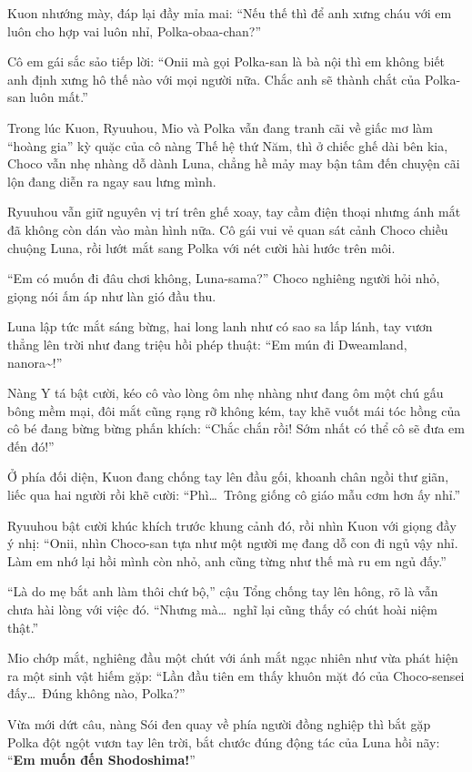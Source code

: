 \documentclass[../main.tex]{subfiles}
\begin{document}
Kuon nhướng mày, đáp lại đầy mỉa mai: ``Nếu thế thì để anh xưng cháu với em luôn cho hợp vai luôn nhỉ, Polka-obaa-chan?''

Cô em gái sắc sảo tiếp lời: ``Onii mà gọi Polka-san là bà nội thì em không biết anh định xưng hô thế nào với mọi người nữa. Chắc anh sẽ thành chắt của Polka-san luôn mất.''

Trong lúc Kuon, Ryuuhou, Mio và Polka vẫn đang tranh cãi về giấc mơ làm ``hoàng gia'' kỳ quặc của cô nàng Thế hệ thứ Năm, thì ở chiếc ghế dài bên kia, Choco vẫn nhẹ nhàng dỗ dành Luna, chẳng hề mảy may bận tâm đến chuyện cãi lộn đang diễn ra ngay sau lưng mình.

Ryuuhou vẫn giữ nguyên vị trí trên ghế xoay, tay cầm điện thoại nhưng ánh mắt đã không còn dán vào màn hình nữa. Cô gái vui vẻ quan sát cảnh Choco chiều chuộng Luna, rồi lướt mắt sang Polka với nét cười hài hước trên môi.

``Em có muốn đi đâu chơi không, Luna-sama?'' Choco nghiêng người hỏi nhỏ, giọng nói ấm áp như làn gió đầu thu.

Luna lập tức mắt sáng bừng, hai long lanh như có sao sa lấp lánh, tay vươn thẳng lên trời như đang triệu hồi phép thuật: ``Em mún đi Dweamland, nanora\~{}!''

Nàng Y tá bật cười, kéo cô vào lòng ôm nhẹ nhàng như đang ôm một chú gấu bông mềm mại, đôi mắt cũng rạng rỡ không kém, tay khẽ vuốt mái tóc hồng của cô bé đang bừng bừng phấn khích: ``Chắc chắn rồi! Sớm nhất có thể cô sẽ đưa em đến đó!''


Ở phía đối diện, Kuon đang chống tay lên đầu gối, khoanh chân ngồi thư giãn, liếc qua hai người rồi khẽ cười: ``Phì\dots\ Trông giống cô giáo mẫu cơm hơn ấy nhỉ.''

Ryuuhou bật cười khúc khích trước khung cảnh đó, rồi nhìn Kuon với giọng đầy ý nhị: ``Onii, nhìn Choco-san tựa như một người mẹ đang dỗ con đi ngủ vậy nhỉ. Làm em nhớ lại hồi mình còn nhỏ, anh cũng từng như thế mà ru em ngủ đấy.''

``Là do mẹ bắt anh làm thôi chứ bộ,'' cậu Tổng chống tay lên hông, rõ là vẫn chưa hài lòng với việc đó. ``Nhưng mà\dots\ nghĩ lại cũng thấy có chút hoài niệm thật.''

Mio chớp mắt, nghiêng đầu một chút với ánh mắt ngạc nhiên như vừa phát hiện ra một sinh vật hiếm gặp: ``Lần đầu tiên em thấy khuôn mặt đó của Choco-sensei đấy\dots\ Đúng không nào, Polka?''

Vừa mới dứt câu, nàng Sói đen quay về phía người đồng nghiệp thì bắt gặp Polka đột ngột vươn tay lên trời, bắt chước đúng động tác của Luna hồi nãy: ``\textbf{Em muốn đến Shodoshima!}''
\end{document}

